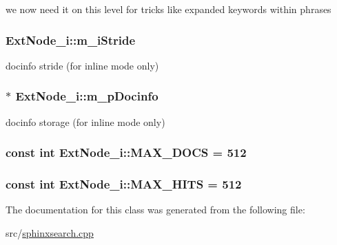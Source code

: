 we now need it on this level for tricks like expanded keywords within phrases 

\hypertarget{classExtNode__i_a8fa9b67163adbca92405ac89a39d0734}{
\subsubsection[{m\-\_\-i\-Stride}]{ Ext\-Node\-\_\-i\-::m\-\_\-i\-Stride}}\label{classExtNode__i_a8fa9b67163adbca92405ac89a39d0734}


docinfo stride (for inline mode only) 

\hypertarget{classExtNode__i_ad270789c4ab2803c07397fb5b93cba12}{
\subsubsection[{m\-\_\-p\-Docinfo}]{$\ast$ Ext\-Node\-\_\-i\-::m\-\_\-p\-Docinfo\hspace{0.3cm}{\ttfamily [protected]}}}\label{classExtNode__i_ad270789c4ab2803c07397fb5b93cba12}


docinfo storage (for inline mode only) 

\hypertarget{classExtNode__i_afe46dd6ff6757d7a0bf3318fd1462bf9}{
\subsubsection[{M\-A\-X\-\_\-\-D\-O\-C\-S}]{\setlength{\rightskip}{0pt plus 5cm}const {\bf int} Ext\-Node\-\_\-i\-::\-M\-A\-X\-\_\-\-D\-O\-C\-S = 512\hspace{0.3cm}{\ttfamily [static]}}}\label{classExtNode__i_afe46dd6ff6757d7a0bf3318fd1462bf9}
\hypertarget{classExtNode__i_a79b81cba51253fdbe56fd3595fac9ab4}{
\subsubsection[{M\-A\-X\-\_\-\-H\-I\-T\-S}]{\setlength{\rightskip}{0pt plus 5cm}const {\bf int} Ext\-Node\-\_\-i\-::\-M\-A\-X\-\_\-\-H\-I\-T\-S = 512\hspace{0.3cm}{\ttfamily [static]}}}\label{classExtNode__i_a79b81cba51253fdbe56fd3595fac9ab4}


The documentation for this class was generated from the following file\-:\begin{DoxyCompactItemize}
\item 
src/\hyperlink{sphinxsearch_8cpp}{sphinxsearch.\-cpp}\end{DoxyCompactItemize}
